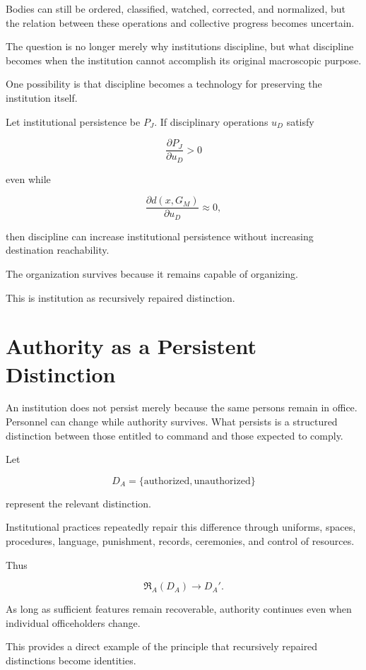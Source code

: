\documentclass[11pt,oneside]{book}
\theoremstyle{definition}
\theoremstyle{remark}
\newcommand{\Repair}{\mathfrak{R}}
\begin{document}
Bodies can still be ordered, classified, watched, corrected, and normalized, but the relation between these operations and collective progress becomes uncertain.

The question is no longer merely why institutions discipline, but what discipline becomes when the institution cannot accomplish its original macroscopic purpose.

One possibility is that discipline becomes a technology for preserving the institution itself.

Let institutional persistence be \(P_J\). If disciplinary operations \(u_D\) satisfy

\[
\frac{\partial P_J}{\partial u_D}>0
\]

even while

\[
\frac{\partial d(x,G_M)}{\partial u_D}\approx0,
\]

then discipline can increase institutional persistence without increasing destination reachability.

The organization survives because it remains capable of organizing.

This is institution as recursively repaired distinction.

\section{Authority as a Persistent Distinction}

An institution does not persist merely because the same persons remain in office. Personnel can change while authority survives. What persists is a structured distinction between those entitled to command and those expected to comply.

Let

\[
D_A
=
\{\text{authorized},\text{unauthorized}\}
\]

represent the relevant distinction.

Institutional practices repeatedly repair this difference through uniforms, spaces, procedures, language, punishment, records, ceremonies, and control of resources.

Thus

\[
\Repair_A(D_A)
\rightarrow
D_A'.
\]

As long as sufficient features remain recoverable, authority continues even when individual officeholders change.

This provides a direct example of the principle that recursively repaired distinctions become identities.
\end{document}
